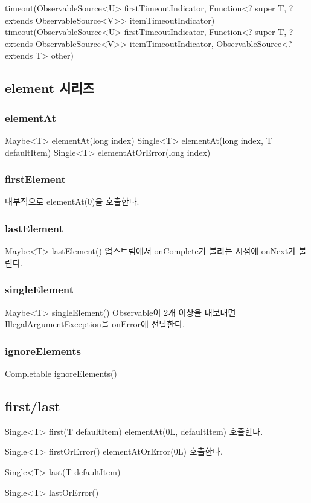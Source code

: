 \documentclass{book}
\begin{document}
{timeout(ObservableSource<U> firstTimeoutIndicator,
            Function<? super T, ? extends ObservableSource<V>> itemTimeoutIndicator)
timeout(ObservableSource<U> firstTimeoutIndicator,
            Function<? super T, ? extends ObservableSource<V>> itemTimeoutIndicator,
                    ObservableSource<? extends T> other)                        

\subsection{element 시리즈}
\subsubsection{elementAt}
Maybe<T> elementAt(long index)
Single<T> elementAt(long index, T defaultItem)
Single<T> elementAtOrError(long index)

\subsubsection{firstElement}
내부적으로 elementAt(0)을 호출한다. 

\subsubsection{lastElement}
Maybe<T> lastElement()
업스트림에서 onComplete가 불리는 시점에 onNext가 불린다. 

\subsubsection{singleElement}
Maybe<T> singleElement()
Observable이 2개 이상을 내보내면 IllegalArgumentException을 onError에 전달한다.

\subsubsection{ignoreElements}
Completable ignoreElements()

\subsection{first/last}
Single<T> first(T defaultItem) 
elementAt(0L, defaultItem) 호출한다.

Single<T> firstOrError()
elementAtOrError(0L) 호출한다.

Single<T> last(T defaultItem)

Single<T> lastOrError()

}
\end{document}
